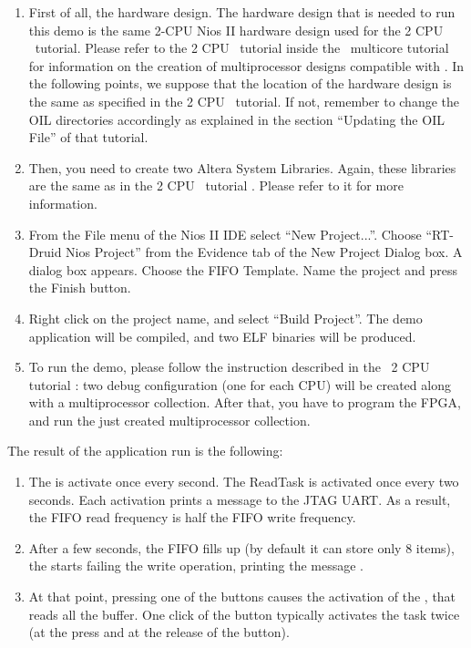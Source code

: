 \begin{enumerate}
\item First of all, the hardware design. The hardware design that is
  needed to run this demo is the same 2-CPU Nios II hardware design
  used for the 2 CPU \ee\ tutorial. Please refer to the 2 CPU \ee\
  tutorial inside the \ee\ multicore tutorial
  \cite{Evidence-multicpu-tutorial} for information on the creation of
  multiprocessor designs compatible with \ee. In the following points,
  we suppose that the location of the hardware design is the same as
  specified in the 2 CPU \ee\ tutorial. If not, remember to change the
  OIL directories accordingly as explained in the section ``Updating
  the OIL File'' of that tutorial.

\item Then, you need to create two Altera System Libraries. Again,
  these libraries are the same as in the 2 CPU \ee\ tutorial
  \cite{Evidence-multicpu-tutorial}. Please refer to it for more
  information.

\item From the File menu of the Nios II IDE select ``New
  Project...''. Choose ``RT-Druid Nios Project'' from the Evidence tab
  of the New Project Dialog box. A dialog box appears. Choose the FIFO
  Template. Name the project \file{demo_fifo} and press the Finish
  button.

\item Right click on the project name, and select ``Build Project''.
  The demo application will be compiled, and two ELF binaries will be
  produced.

\item To run the demo, please follow the instruction described in the
  \ee\ 2 CPU tutorial \cite{Evidence-multicpu-tutorial}: two debug
  configuration (one for each CPU) will be created along with a
  multiprocessor collection. After that, you have to program the FPGA,
  and run the just created multiprocessor collection.
\end{enumerate}

The result of the application run is the following:

\begin{enumerate}
\item The  is activate once every second. The ReadTask
  is activated once every two seconds. Each activation prints a
  message to the JTAG UART. As a result, the FIFO read frequency is half
  the FIFO write frequency.
\item After a few seconds, the FIFO fills up (by default it can store
  only 8 items), the \fn{WriteTask} starts failing the write
  operation, printing the message .
\item At that point, pressing one of the buttons causes the activation
  of the \fn{ButtonReadTask}, that reads all the buffer. One click of
  the button typically activates the task twice (at the press and at
  the release of the button).
\end{enumerate}

